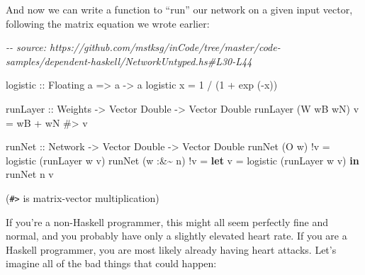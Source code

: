 \documentclass[]{article}
\newenvironment{Shaded}{}{}
\newcommand{\CommentTok}[1]{\textcolor[rgb]{0.38,0.63,0.69}{\textit{#1}}}
\newcommand{\DataTypeTok}[1]{\textcolor[rgb]{0.56,0.13,0.00}{#1}}
\newcommand{\DecValTok}[1]{\textcolor[rgb]{0.25,0.63,0.44}{#1}}
\newcommand{\FunctionTok}[1]{\textcolor[rgb]{0.02,0.16,0.49}{#1}}
\newcommand{\KeywordTok}[1]{\textcolor[rgb]{0.00,0.44,0.13}{\textbf{#1}}}
\newcommand{\NormalTok}[1]{#1}
\newcommand{\OperatorTok}[1]{\textcolor[rgb]{0.40,0.40,0.40}{#1}}
\newcommand{\OtherTok}[1]{\textcolor[rgb]{0.00,0.44,0.13}{#1}}
\begin{document}
And now we can write a function to ``run'' our network on a given input vector,
following the matrix equation we wrote earlier:

\begin{Shaded}
\begin{Highlighting}[]
\CommentTok{{-}{-} source: https://github.com/mstksg/inCode/tree/master/code{-}samples/dependent{-}haskell/NetworkUntyped.hs\#L30{-}L44}

\OtherTok{logistic ::} \DataTypeTok{Floating}\NormalTok{ a }\OtherTok{=>}\NormalTok{ a }\OtherTok{{-}>}\NormalTok{ a}
\NormalTok{logistic x }\OtherTok{=} \DecValTok{1} \OperatorTok{/}\NormalTok{ (}\DecValTok{1} \OperatorTok{+} \FunctionTok{exp}\NormalTok{ (}\OperatorTok{{-}}\NormalTok{x))}

\OtherTok{runLayer ::} \DataTypeTok{Weights} \OtherTok{{-}>} \DataTypeTok{Vector} \DataTypeTok{Double} \OtherTok{{-}>} \DataTypeTok{Vector} \DataTypeTok{Double}
\NormalTok{runLayer (}\DataTypeTok{W}\NormalTok{ wB wN) v }\OtherTok{=}\NormalTok{ wB }\OperatorTok{+}\NormalTok{ wN }\OperatorTok{\#>}\NormalTok{ v}

\OtherTok{runNet ::} \DataTypeTok{Network} \OtherTok{{-}>} \DataTypeTok{Vector} \DataTypeTok{Double} \OtherTok{{-}>} \DataTypeTok{Vector} \DataTypeTok{Double}
\NormalTok{runNet (}\DataTypeTok{O}\NormalTok{ w)      }\OperatorTok{!}\NormalTok{v }\OtherTok{=}\NormalTok{ logistic (runLayer w v)}
\NormalTok{runNet (w }\OperatorTok{:\&\textasciitilde{}}\NormalTok{ n\textquotesingle{}) }\OperatorTok{!}\NormalTok{v }\OtherTok{=} \KeywordTok{let}\NormalTok{ v\textquotesingle{} }\OtherTok{=}\NormalTok{ logistic (runLayer w v)}
                       \KeywordTok{in}\NormalTok{  runNet n\textquotesingle{} v\textquotesingle{}}
\end{Highlighting}
\end{Shaded}

(\texttt{\#\textgreater{}} is matrix-vector multiplication)

If you're a non-Haskell programmer, this might all seem perfectly fine and
normal, and you probably have only a slightly elevated heart rate. If you are a
Haskell programmer, you are most likely already having heart attacks. Let's
imagine all of the bad things that could happen:
\end{document}
